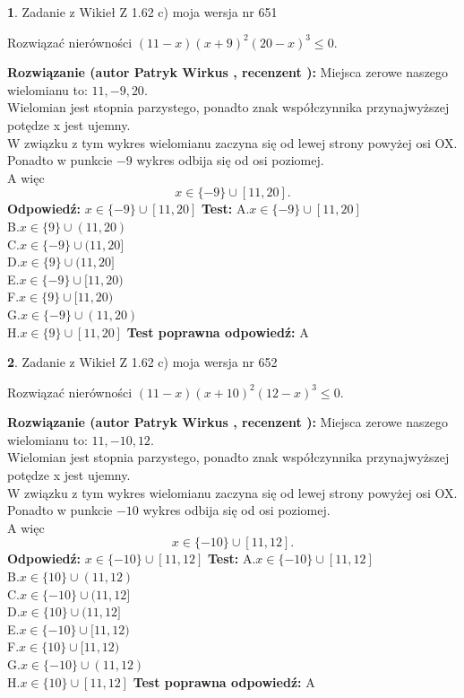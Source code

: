 \documentclass[12pt, a4paper]{article}
\theoremstyle{definition} %
\newtheorem{zad}{}
\newcommand{\zadStart}[1]{\begin{zad}#1\newline}
\newcommand{\zadStop}{\end{zad}}
\newcommand{\rozwStart}[2]{\noindent \textbf{Rozwiązanie (autor #1 , recenzent #2): }\newline}
\newcommand{\rozwStop}{\newline}
\newcommand{\odpStart}{\noindent \textbf{Odpowiedź:}\newline}
\newcommand{\odpStop}{\newline}
\newcommand{\testStart}{\noindent \textbf{Test:}\newline}
\newcommand{\testStop}{\newline}
\newcommand{\kluczStart}{\noindent \textbf{Test poprawna odpowiedź:}\newline}
\newcommand{\kluczStop}{\newline}
\begin{document}
\zadStart{Zadanie z Wikieł Z 1.62 c) moja wersja nr 651}

Rozwiązać nierówności $(11-x)(x+9)^{2}(20-x)^{3}\le0$.
\zadStop
\rozwStart{Patryk Wirkus}{}
Miejsca zerowe naszego wielomianu to: $11, -9, 20$.\\
Wielomian jest stopnia parzystego, ponadto znak współczynnika przy\linebreak najwyższej potędze x jest ujemny.\\ W związku z tym wykres wielomianu zaczyna się od lewej strony powyżej osi OX.\\
Ponadto w punkcie $-9$ wykres odbija się od osi poziomej.\\
A więc $$x \in \{-9\} \cup [11,20].$$
\rozwStop
\odpStart
$x \in \{-9\} \cup [11,20]$
\odpStop
\testStart
A.$x \in \{-9\} \cup [11,20]$\\
B.$x \in \{9\} \cup (11,20)$\\
C.$x \in \{-9\} \cup (11,20]$\\
D.$x \in \{9\} \cup (11,20]$\\
E.$x \in \{-9\} \cup [11,20)$\\
F.$x \in \{9\} \cup [11,20)$\\
G.$x \in \{-9\} \cup (11,20)$\\
H.$x \in \{9\} \cup [11,20]$
\testStop
\kluczStart
A
\kluczStop



\zadStart{Zadanie z Wikieł Z 1.62 c) moja wersja nr 652}

Rozwiązać nierówności $(11-x)(x+10)^{2}(12-x)^{3}\le0$.
\zadStop
\rozwStart{Patryk Wirkus}{}
Miejsca zerowe naszego wielomianu to: $11, -10, 12$.\\
Wielomian jest stopnia parzystego, ponadto znak współczynnika przy\linebreak najwyższej potędze x jest ujemny.\\ W związku z tym wykres wielomianu zaczyna się od lewej strony powyżej osi OX.\\
Ponadto w punkcie $-10$ wykres odbija się od osi poziomej.\\
A więc $$x \in \{-10\} \cup [11,12].$$
\rozwStop
\odpStart
$x \in \{-10\} \cup [11,12]$
\odpStop
\testStart
A.$x \in \{-10\} \cup [11,12]$\\
B.$x \in \{10\} \cup (11,12)$\\
C.$x \in \{-10\} \cup (11,12]$\\
D.$x \in \{10\} \cup (11,12]$\\
E.$x \in \{-10\} \cup [11,12)$\\
F.$x \in \{10\} \cup [11,12)$\\
G.$x \in \{-10\} \cup (11,12)$\\
H.$x \in \{10\} \cup [11,12]$
\testStop
\kluczStart
A
\kluczStop
\end{document}
